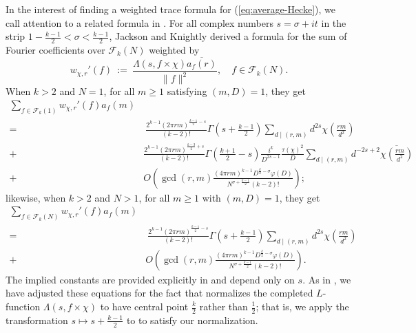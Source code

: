 \documentclass[12pt, reqno,oneside]{amsart}
\theoremstyle{plain}
\theoremstyle{definition}
\theoremstyle{remark}
\theoremstyle{plain}
\numberwithin{equation}{section}
\begin{document}
In the interest of finding a weighted trace formula for (\ref{eq:average-Hecke}), we call attention to a related formula in \cite[Theorem 1.1]{JK15}. For all complex numbers $s=\sigma+it$ in the strip $1-\frac{k-1}{2}<\sigma<\frac{k-1}{2}$, Jackson and Knightly derived a formula for the sum of Fourier coefficients over $\mathcal{F}_k(N)$ weighted by
\begin{equation}\label{eq:JK-weights}
w_{\chi,r}'(f)\ := \ \frac{\Lambda\left(s,f\times\chi\right)\overline{a_f(r)}}{\lVert f\rVert^2},\quad f\in\mathcal{F}_k(N).
\end{equation}
When $k>2$ and $N=1$, for all $m\geq1$ satisfying $(m,D)=1$, they get
\begin{align}\nonumber
\sum_{f\in\mathcal{F}_k(1)}w_{\chi,r}'(f)a_f(m)& \\
\nonumber 
= \ & \ \frac{2^{k-1}(2 \pi rm)^{\frac{k-1}{2}-s}}{(k-2)!}\Gamma\left(s+\frac{k-1}{2}\right)\sum_{d\mid(r,m)}d^{2s}\chi\left(\frac{rm}{d^2}\right)\\
\nonumber
+ \ & \frac{2^{k-1}(2\pi rm)^{\frac{k-3}{2}+s}}{(k-2)!}\Gamma\left(\frac{k+1}{2}-s\right)\frac{i^k}{D^{2s-1}}\frac{\tau(\chi)^2}{D}\sum_{d\mid(r,m)}d^{-2s+2}\overline{\chi\left(\frac{rm}{d^2}\right)}\\
\label{eq:KR-trace-1.1'}
+ \ & O\left(\gcd(r,m)\frac{(4\pi rm)^{k-1}D^{\frac{k}{2}-\sigma}\varphi(D)}{N^{\sigma+\frac{k-1}{2}}(k-2)!}\right);
\end{align}
likewise, when $k>2$ and $N>1$, for all $m\geq1$ with $(m,D)=1$, they get
\begin{align}\nonumber
\sum_{f\in\mathcal{F}_k(N)}w_{\chi,r}'(f)a_f(m) & \\
\nonumber 
= \ & \ \frac{2^{k-1}(2 \pi rm)^{\frac{k-1}{2}-s}}{(k-2)!}\Gamma\left(s+\frac{k-1}{2}\right)\sum_{d\mid(r,m)}d^{2s}\chi\left(\frac{rm}{d^2}\right)\\
\label{eq:KR-trace-2.1'}
+ \ & O\left(\gcd(r,m)\frac{(4\pi rm)^{k-1}D^{\frac{k}{2}-\sigma}\varphi(D)}{N^{\sigma+\frac{k-1}{2}}(k-2)!}\right).
\end{align}
The implied constants are provided explicitly in \cite[(1.5)]{JK15} and depend only on $s$. As in \cite[160]{KR18}, we have adjusted these equations for the fact that \cite{JK15} normalizes the completed $L$-function $\Lambda(s,f\times\chi)$ to have central point $\frac{k}{2}$ rather than $\frac{1}{2}$; that is, we apply the transformation $s \mapsto s+\frac{k-1}{2}$ to \cite[(1.4)]{JK15} to satisfy our normalization.
\end{document}
